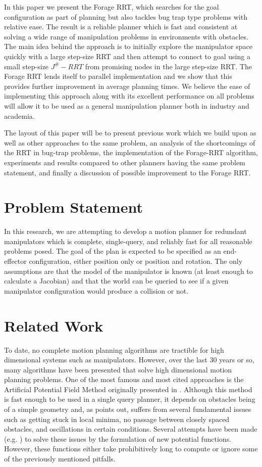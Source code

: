 \documentclass[conference]{IEEEtran}
\begin{document}
In this paper we present the Forage RRT, which searches for the goal configuration as part of planning but also tackles bug trap type
problems with relative ease. The result is a reliable planner which is fast and consistent at solving a wide range of manipulation problems
in environments with obstacles. The main idea behind the approach is to initially explore the manipulator space quickly with a large
step-size RRT and then attempt to connect to goal using a small step-size $J^{\#}-RRT$ from promising nodes in the large step-size RRT. The
Forage RRT lends itself to parallel implementation and we show that this provides further improvement in average planning times. We believe
the ease of implementing this approach along with its excellent performance on all problems will allow it to be used as a general
manipulation planner both in industry and academia.

The layout of this paper will be to present previous work which we build upon as well as other approaches to the same problem, an analysis
of the shortcomings of the RRT in bug-trap problems, the implementation of the Forage-RRT algorithm, experiments and results compared to
other planners having the same problem statement, and finally a discussion of possible improvement to the Forage RRT.  

\section{Problem Statement}
In this research, we are attempting to develop a motion planner for redundant manipulators which is complete, single-query, and reliably
fast for all reasonable problems posed. The goal of the plan is expected to be specified as an end-effector configuration, either position
only or position and rotation. The only assumptions are that the model of the manipulator is known (at least enough to calculate a
Jacobian) and that the world can be queried to see if a given manipulator configuration would produce a collision or not.

\section{Related Work}
To date, no complete motion planning algorithms are tractible for high dimensional systems such as manipulators. However, over the last 30
years or so, many algorithms have been presented that solve high dimensional motion planning problems. One of the most famous and most cited
approaches is the Artificial Potential Field Method originally presented in \cite{khatib86}. Although this method is fast enough to be
used in a single query planner, it depends on obstacles being of a simple geometry and, as \cite{koren91} points out, suffers from several
fundamental issues such as getting stuck in local minima, no passage between closely spaced obstacles, and oscillations in certain
conditions. Several attempts have been made (e.g. \cite{connolly90} \cite{ge00}) to solve these issues by the formulation of new potential
functions. However, these functions either take prohibitively long to compute or ignore some of the previously mentioned pitfalls. 
\end{document}
